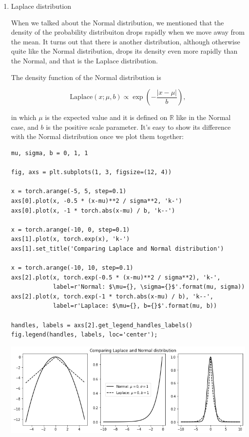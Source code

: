 \documentclass[11pt]{article}
\begin{document}
\begin{enumerate}
\item Laplace distribution
\label{sec:org7b078bd}

When we talked about the Normal distribution, we mentioned that the density of the probability distribuiton drops rapidly when we move away from the mean. It turns out that there is another distribution, although otherwise quite like the Normal distribution, drops its density even more rapidly than the Normal, and that is the Laplace distribution.

The density function of the Normal distribution is

$$\text{Laplace}(x; \mu, b) \propto \exp(- \frac{|x - \mu|}{b}),$$

in which \(\mu\) is the expected value and it is defined on \(\mathbb{R}\) like in the Normal case, and \(b\) is the positive scale parameter. It's easy to show its difference with the Normal distribution once we plot them together:

\begin{verbatim}
mu, sigma, b = 0, 1, 1

fig, axs = plt.subplots(1, 3, figsize=(12, 4))

x = torch.arange(-5, 5, step=0.1)
axs[0].plot(x, -0.5 * (x-mu)**2 / sigma**2, 'k-')
axs[0].plot(x, -1 * torch.abs(x-mu) / b, 'k--')

x = torch.arange(-10, 0, step=0.1)
axs[1].plot(x, torch.exp(x), 'k-')
axs[1].set_title('Comparing Laplace and Normal distribution')

x = torch.arange(-10, 10, step=0.1)
axs[2].plot(x, torch.exp(-0.5 * (x-mu)**2 / sigma**2), 'k-',
            label=r'Normal: $\mu={}, \sigma={}$'.format(mu, sigma))
axs[2].plot(x, torch.exp(-1 * torch.abs(x-mu) / b), 'k--',
            label=r'Laplace: $\mu={}, b={}$'.format(mu, b))

handles, labels = axs[2].get_legend_handles_labels()
fig.legend(handles, labels, loc='center');
\end{verbatim}

\begin{center}
\includegraphics[width=.9\linewidth]{./.ob-jupyter/bf5d089d27ab646230a808172ae042fd88c00bfe.png}
\end{center}


\end{enumerate}
\end{document}
